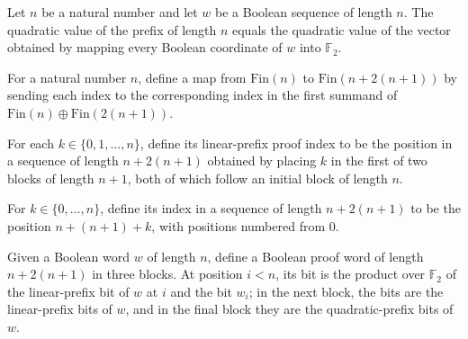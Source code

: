\begin{theorem}
\label{FABL.completeQuadraticPrefixBit_full}
\leanok
{}
Let $n$ be a natural number and let $w$ be a Boolean sequence of length $n$. The
quadratic value of the prefix of length $n$ equals the quadratic value of the vector
obtained by mapping every Boolean coordinate of $w$ into $\mathbb F_2$.
\end{theorem}

\begin{definition}
\label{FABL.completeQuadraticProductProofIndex}
\leanok
For a natural number $n$, define a map from $\mathrm{Fin}(n)$ to
$\mathrm{Fin}(n+2(n+1))$ by sending each index to the corresponding index in the first
summand of $\mathrm{Fin}(n)\oplus\mathrm{Fin}(2(n+1))$.
\end{definition}

\begin{definition}
\label{FABL.completeQuadraticLinearPrefixProofIndex}
\leanok
For each $k\in\{0,1,\ldots,n\}$, define its linear-prefix proof index to be the position
in a sequence of length $n+2(n+1)$ obtained by placing $k$ in the first of two blocks of
length $n+1$, both of which follow an initial block of length $n$.
\end{definition}

\begin{definition}
\label{FABL.completeQuadraticPrefixProofIndex}
\leanok
For $k\in\{0,\ldots,n\}$, define its index in a sequence of length $n+2(n+1)$ to be the
position $n+(n+1)+k$, with positions numbered from $0$.
\end{definition}

\begin{definition}
\label{FABL.completeQuadraticLinearProof}
\leanok
{}
Given a Boolean word $w$ of length $n$, define a Boolean proof word of length $n+2(n+1)$
in three blocks. At position $i<n$, its bit is the product over $\mathbb F_2$ of the
linear-prefix bit of $w$ at $i$ and the bit $w_i$; in the next block, the bits are the
linear-prefix bits of $w$, and in the final block they are the quadratic-prefix bits of
$w$.
\end{definition}

